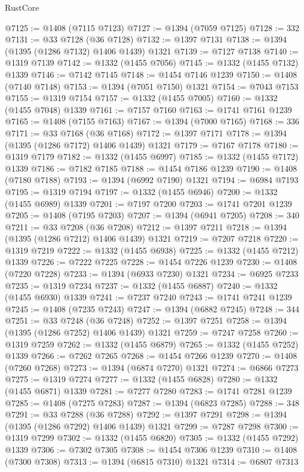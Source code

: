 \begin{lexlean}{RustCore}
\begin{coremodule}
@7125 := @1408 (@7115 @7123)
@7127 := @1394 (@7059 @7125)
@7128 := 332
@7131 := @33 @7128 (@36 @7128)
@7132 := @1397 @7131
@7138 := @1394 (@1395 (@1286 @7132) @1406 @1439) @1321
@7139 := @7127 @7138
@7140 := @1319 @7139
@7142 := @1332 (@1455 @7056)
@7145 := @1332 (@1455 @7132) @1339
@7146 := @7142 @7145
@7148 := @1454 @7146 @1239
@7150 := @1408 (@7140 @7148)
@7153 := @1394 (@7051 @7150) @1321
@7154 := @7043 @7153
@7155 := @1319 @7154
@7157 := @1332 (@1455 @7005)
@7160 := @1332 (@1455 @7048) @1339
@7161 := @7157 @7160
@7163 := @1741 @7161 @1239
@7165 := @1408 (@7155 @7163)
@7167 := @1394 (@7000 @7165)
@7168 := 336
@7171 := @33 @7168 (@36 @7168)
@7172 := @1397 @7171
@7178 := @1394 (@1395 (@1286 @7172) @1406 @1439) @1321
@7179 := @7167 @7178
@7180 := @1319 @7179
@7182 := @1332 (@1455 @6997)
@7185 := @1332 (@1455 @7172) @1339
@7186 := @7182 @7185
@7188 := @1454 @7186 @1239
@7190 := @1408 (@7180 @7188)
@7193 := @1394 (@6992 @7190) @1321
@7194 := @6984 @7193
@7195 := @1319 @7194
@7197 := @1332 (@1455 @6946)
@7200 := @1332 (@1455 @6989) @1339
@7201 := @7197 @7200
@7203 := @1741 @7201 @1239
@7205 := @1408 (@7195 @7203)
@7207 := @1394 (@6941 @7205)
@7208 := 340
@7211 := @33 @7208 (@36 @7208)
@7212 := @1397 @7211
@7218 := @1394 (@1395 (@1286 @7212) @1406 @1439) @1321
@7219 := @7207 @7218
@7220 := @1319 @7219
@7222 := @1332 (@1455 @6938)
@7225 := @1332 (@1455 @7212) @1339
@7226 := @7222 @7225
@7228 := @1454 @7226 @1239
@7230 := @1408 (@7220 @7228)
@7233 := @1394 (@6933 @7230) @1321
@7234 := @6925 @7233
@7235 := @1319 @7234
@7237 := @1332 (@1455 @6887)
@7240 := @1332 (@1455 @6930) @1339
@7241 := @7237 @7240
@7243 := @1741 @7241 @1239
@7245 := @1408 (@7235 @7243)
@7247 := @1394 (@6882 @7245)
@7248 := 344
@7251 := @33 @7248 (@36 @7248)
@7252 := @1397 @7251
@7258 := @1394 (@1395 (@1286 @7252) @1406 @1439) @1321
@7259 := @7247 @7258
@7260 := @1319 @7259
@7262 := @1332 (@1455 @6879)
@7265 := @1332 (@1455 @7252) @1339
@7266 := @7262 @7265
@7268 := @1454 @7266 @1239
@7270 := @1408 (@7260 @7268)
@7273 := @1394 (@6874 @7270) @1321
@7274 := @6866 @7273
@7275 := @1319 @7274
@7277 := @1332 (@1455 @6828)
@7280 := @1332 (@1455 @6871) @1339
@7281 := @7277 @7280
@7283 := @1741 @7281 @1239
@7285 := @1408 (@7275 @7283)
@7287 := @1394 (@6823 @7285)
@7288 := 348
@7291 := @33 @7288 (@36 @7288)
@7292 := @1397 @7291
@7298 := @1394 (@1395 (@1286 @7292) @1406 @1439) @1321
@7299 := @7287 @7298
@7300 := @1319 @7299
@7302 := @1332 (@1455 @6820)
@7305 := @1332 (@1455 @7292) @1339
@7306 := @7302 @7305
@7308 := @1454 @7306 @1239
@7310 := @1408 (@7300 @7308)
@7313 := @1394 (@6815 @7310) @1321
@7314 := @6807 @7313

\end{coremodule}
\end{lexlean}

